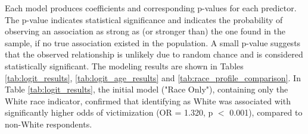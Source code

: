 Each model produces coefficients and corresponding p-values for each predictor. The p-value indicates statistical significance and indicates the probability of observing an association as strong as (or stronger than) the one found in the sample, if no true association existed in the population. A small p-value suggests that the observed relationship is unlikely due to random chance and is considered statistically significant. The modeling results are shown in Tables \ref{tab:logit_results}, \ref{tab:logit_age_results} and \ref{tab:race_profile_comparison}. In Table \ref{tab:logit_results}, the initial model ("Race Only"), containing only the White race indicator, confirmed that identifying as White was associated with significantly higher odds of victimization (OR = 1.320, p $<$ 0.001), compared to non-White respondents.

